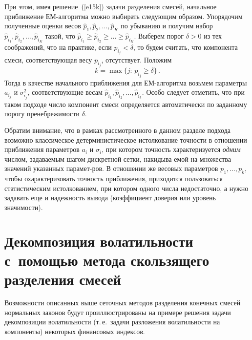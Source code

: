 \begin{multicols}{2}
При этом, имея решение~(\ref{e15k}) задачи разделения смесей, начальное
приближение ЕМ-алгоритма можно выбирать следующим образом.
Упорядочим полученные оценки весов $\widehat p_1, \widehat
p_2,\ldots,\widehat p_K$ по убыванию и получим набор $\widehat
p_{i_1}, \widehat p_{i_2},\ldots,\widehat p_{i_K}$ такой, что
$\widehat p_{i_1}\ge\widehat p_{i_2}\ge\ldots\ge\widehat p_{i_K}$.
Выберем порог $\delta>0$ из тех соображений, что на практике, если
$p_{i_j}<\delta$, то будем считать, что компонента смеси,
соответствующая весу $p_{i_j}$, отсутствует. Положим
$$
k=\max\{j:\,p_{i_j}\ge\delta\}\,.
$$
Тогда в качестве начального
приближения для ЕМ-алгоритма возьмем параметры $a_{i_j}$ и
$\sigma^2_{i_j}$, соответствующие весам $\widehat p_{i_1},
\widehat p_{i_2},\ldots,\widehat p_{i_k}$. Особо следует отметить,
что при таком подходе число компонент смеси определяется
автоматически по заданному порогу пренебрежимости $\delta$.

Обратим внимание, что в рамках рассмотренного в данном разделе
подхода возможно классическое детерминистическое истолкование
точности в отношении приближения параметров $a_i$ и $\sigma_i$,
при котором точность характеризуется {\it одним} числом,\linebreak
задаваемым шагом дискретной сетки, на\-ки\-ды\-ва-\linebreak емой на множества
значений указанных парамет-\linebreak ров. В отношении же весовых параметров
$p_1,\ldots,p_k$, чтобы охарактеризовать точность приближения,
приходится пользоваться статистическим истолкованием, при котором
одного числа недостаточно, а нужно задавать еще и надежность
вывода (коэффициент доверия или уровень значимости).

\section{Декомпозиция волатильности с~помощью метода скользящего
разделения смесей}

Возможности описанных выше сеточных методов разделения конечных
смесей нормальных законов будут проиллюстрированы на примере
решения задачи декомпозиции волатильности (т.\,е.\ задачи
разложения волатильности на компоненты) некоторых финансовых
индексов.


\end{multicols}
